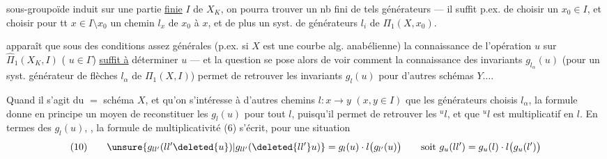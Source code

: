 sous-groupoïde induit sur une partie \uline{finie}  $I$ de $X_K$, on pourra trouver un nb fini de tels générateurs --- il suffit p.ex. de choisir un  $x_0\in I$, et choisir pour tt $x\in I\setminus x_0$ un chemin $l_x$ de $x_0$ à $x$, et de plus un syst.  de générateurs $l_i$ de $\Pi_1(X,x_0)$.

 apparaît que sous des conditions assez générales (p.ex. si $X$ est une courbe alg. anabélienne) la connaissance de l'opération $u$ sur $\widehat{\Pi}_1(X_K,I)$ ( $u\in\Gamma$) \uline{suffit à} déterminer $u$ --- et la question se pose alors de voir comment la connaissance des invariants  $g_{l_\alpha}(u)$ (pour un syst. générateur de flèches $l_\alpha$ de $\Pi_1(X,I)$) permet de retrouver les invariants $g_l(u)$ pour d'autres schémas $Y\ldots$.

Quand il s'agit du $=$ schéma $X$, et qu'on s'intéresse à d'autres chemins $l:x\longrightarrow y$ $(x,y\in I)$ que les générateurs choisis $l_\alpha$, la formule donne en principe un moyen de reconstituer les $g_l(u)$ pour tout $l$, puisqu'il permet de retrouver les ${}^u l$, et que ${}^u l$ est multiplicatif en $l$. En termes des $g_l(u)$, , la formule de multiplicativité (6) s'écrit, pour une situation
\[
(10)\qquad \unsure{g_{ll'}(ll'\deleted{u})|g_{ll'}(\deleted{ll'}u)}=g_l(u)\cdot l\bigl(g_{l'}(u)\bigr)
\qquad\text{soit }g_u(ll')=g_u(l)\cdot l\bigl(g_u(l')\bigr)
\]

